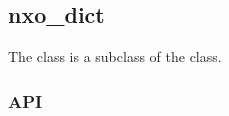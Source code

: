 %
%
%
%
%

\subsection{nxo\_dict}
\label{nxo_dict}

The  class is a subclass of the  class.

\subsubsection{API}
